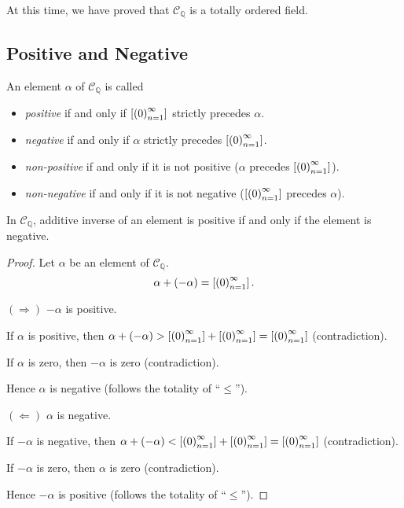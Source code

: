 At this time, we have proved that $\mathscr{C}_{\mathbb{Q}}$ is a totally ordered field.

\subsection{Positive and Negative}

\begin{definition}
    An element $\alpha$ of $\mathscr{C}_{\mathbb{Q}}$ is called
    \begin{itemize}
        \item \textit{positive} if and only if $\left[{{\left({0}\right)}^{\infty}_{n=1}}\right]$ strictly precedes $\alpha$.
        \item \textit{negative} if and only if $\alpha$ strictly precedes $\left[{{\left({0}\right)}^{\infty}_{n=1}}\right]$.
        \item \textit{non-positive} if and only if it is not positive ($\alpha$ precedes $\left[{{\left({0}\right)}^{\infty}_{n=1}}\right]$).
        \item \textit{non-negative} if and only if it is not negative ($\left[{{\left({0}\right)}^{\infty}_{n=1}}\right]$ precedes $\alpha$).
    \end{itemize}
\end{definition}

\begin{theorem}\label{theorem:chapter1:sign-and-additive-inverse}
    In $\mathscr{C}_{\mathbb{Q}}$, additive inverse of an element is positive if and only if the element is negative.
\end{theorem}

\begin{proof}
    Let $\alpha$ be an element of $\mathscr{C}_{\mathbb{Q}}$.
    \[
        \alpha + (-\alpha) = \left[{{\left({0}\right)}^{\infty}_{n=1}}\right].
    \]

    $(\Rightarrow)$ $-\alpha$ is positive.

    If $\alpha$ is positive, then $\alpha + (-\alpha) > \left[{{\left({0}\right)}^{\infty}_{n=1}}\right] + \left[{{\left({0}\right)}^{\infty}_{n=1}}\right] = \left[{{\left({0}\right)}^{\infty}_{n=1}}\right]$ (contradiction).

    If $\alpha$ is zero, then $-\alpha$ is zero (contradiction).

    Hence $\alpha$ is negative (follows the totality of ``$\le$'').

    \bigskip
    $(\Leftarrow)$ $\alpha$ is negative.

    If $-\alpha$ is negative, then $\alpha + (-\alpha) < \left[{{\left({0}\right)}^{\infty}_{n=1}}\right] + \left[{{\left({0}\right)}^{\infty}_{n=1}}\right] = \left[{{\left({0}\right)}^{\infty}_{n=1}}\right]$ (contradiction).

    If $-\alpha$ is zero, then $\alpha$ is zero (contradiction).

    Hence $-\alpha$ is positive (follows the totality of ``$\le$'').
\end{proof}

